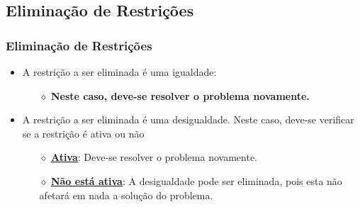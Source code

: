 \documentclass{beamer}
\begin{document}
\subsection{Eliminação de Restrições}
\begin{frame}
	\frametitle{Eliminação de Restrições}
	\begin{itemize}
		\item {A restrição a ser eliminada é uma igualdade:}
			\begin{itemize}
			\item[$\diamond$] \textbf{Neste caso, deve-se resolver o problema novamente.}
			\end{itemize} 
		\item {A restrição a ser eliminada é uma desigualdade. Neste caso, deve-se verificar se a restrição é ativa ou não}
			\begin{itemize}
			\item[$\diamond$] \textbf{\underline{Ativa}}: Deve-se resolver o problema novamente.
			\item[$\diamond$] \textbf{\underline{Não está ativa}}: A desigualdade pode ser eliminada, pois esta não afetará em nada a solução do problema.
			\end{itemize}
	\end{itemize}
\end{frame}
\end{document}
